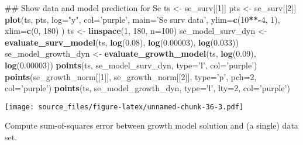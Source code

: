 \documentclass[]{article}
\newenvironment{Shaded}{\begin{snugshade}}{\end{snugshade}}
\newcommand{\KeywordTok}[1]{\textcolor[rgb]{0.13,0.29,0.53}{\textbf{#1}}}
\newcommand{\DataTypeTok}[1]{\textcolor[rgb]{0.13,0.29,0.53}{#1}}
\newcommand{\DecValTok}[1]{\textcolor[rgb]{0.00,0.00,0.81}{#1}}
\newcommand{\FloatTok}[1]{\textcolor[rgb]{0.00,0.00,0.81}{#1}}
\newcommand{\StringTok}[1]{\textcolor[rgb]{0.31,0.60,0.02}{#1}}
\newcommand{\OperatorTok}[1]{\textcolor[rgb]{0.81,0.36,0.00}{\textbf{#1}}}
\newcommand{\NormalTok}[1]{#1}
\begin{document}
\begin{Shaded}
\begin{Highlighting}[]
\NormalTok{## Show data and model prediction for Se}
\NormalTok{ts <-}\StringTok{ }\NormalTok{se_surv[[}\DecValTok{1}\NormalTok{]]}
\NormalTok{pts <-}\StringTok{ }\NormalTok{se_surv[[}\DecValTok{2}\NormalTok{]]}
\KeywordTok{plot}\NormalTok{(ts, pts, }
     \DataTypeTok{log=}\StringTok{"y"}\NormalTok{, }
     \DataTypeTok{col=}\StringTok{'purple'}\NormalTok{, }
     \DataTypeTok{main=}\StringTok{'Se surv data'}\NormalTok{, }
     \DataTypeTok{ylim=}\KeywordTok{c}\NormalTok{(}\DecValTok{10}\OperatorTok{**-}\DecValTok{4}\NormalTok{, }\DecValTok{1}\NormalTok{),}
     \DataTypeTok{xlim=}\KeywordTok{c}\NormalTok{(}\DecValTok{0}\NormalTok{, }\DecValTok{180}\NormalTok{)}
\NormalTok{     )}
\NormalTok{ts <-}\StringTok{ }\KeywordTok{linspace}\NormalTok{(}\DecValTok{1}\NormalTok{, }\DecValTok{180}\NormalTok{, }\DataTypeTok{n=}\DecValTok{100}\NormalTok{)}
\NormalTok{se_model_surv_dyn <-}\StringTok{ }\KeywordTok{evaluate_surv_model}\NormalTok{(ts, }\KeywordTok{log}\NormalTok{(}\FloatTok{0.08}\NormalTok{), }\KeywordTok{log}\NormalTok{(}\FloatTok{0.00003}\NormalTok{), }\KeywordTok{log}\NormalTok{(}\FloatTok{0.033}\NormalTok{))}
\NormalTok{se_model_growth_dyn <-}\StringTok{ }\KeywordTok{evaluate_growth_model}\NormalTok{(ts, }\KeywordTok{log}\NormalTok{(}\FloatTok{0.09}\NormalTok{), }\KeywordTok{log}\NormalTok{(}\FloatTok{0.00003}\NormalTok{))}
\KeywordTok{points}\NormalTok{(ts, se_model_surv_dyn, }\DataTypeTok{type=}\StringTok{'l'}\NormalTok{, }\DataTypeTok{col=}\StringTok{'purple'}\NormalTok{)}
\KeywordTok{points}\NormalTok{(se_growth_norm[[}\DecValTok{1}\NormalTok{]], se_growth_norm[[}\DecValTok{2}\NormalTok{]], }\DataTypeTok{type=}\StringTok{'p'}\NormalTok{, }\DataTypeTok{pch=}\DecValTok{2}\NormalTok{, }\DataTypeTok{col=}\StringTok{'purple'}\NormalTok{)}
\KeywordTok{points}\NormalTok{(ts, se_model_growth_dyn, }\DataTypeTok{type=}\StringTok{'l'}\NormalTok{, }\DataTypeTok{lty=}\DecValTok{2}\NormalTok{, }\DataTypeTok{col=}\StringTok{'purple'}\NormalTok{)}
\end{Highlighting}
\end{Shaded}

\texttt{[image: source\_files/figure-latex/unnamed-chunk-36-3.pdf]}

Compute sum-of-squares error between growth model solution and (a
single) data set.
\end{document}
